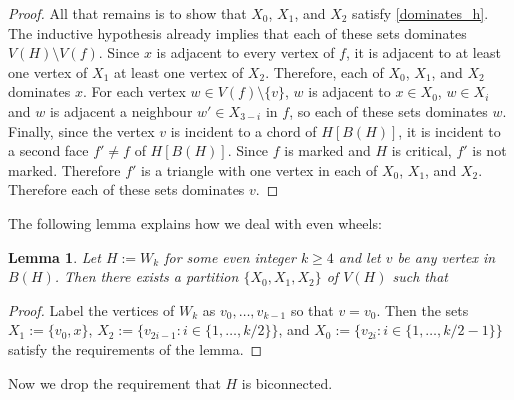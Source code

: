 \documentclass[12pt]{article}
\newtheorem{lem}{Lemma}
\theoremstyle{definition}
\newcommand{\pat}[1]{[\textcolor{red}{PM: #1}]}
\begin{document}
\begin{proof}
  All that remains is to show that $X_0$, $X_1$, and $X_2$ satisfy \cref{dominates_h}.  The inductive hypothesis already implies that each of these sets dominates $V(H)\setminus V(f)$.  Since $x$ is adjacent to every vertex of $f$, it is adjacent to at least one vertex of $X_1$ at least one vertex of $X_2$.  Therefore, each of $X_0$, $X_1$, and $X_2$ dominates $x$.  For each vertex $w\in V(f)\setminus\{v\}$, $w$ is adjacent to $x\in X_0$, $w\in X_{i}$ and $w$ is adjacent a neighbour $w'\in X_{3-i}$ in $f$, so each of these sets dominates $w$.  Finally, since the vertex $v$ is incident to a chord of $H[B(H)]$, it is incident to a second face $f'\neq f$ of $H[B(H)]$.  Since $f$ is marked and $H$ is critical, $f'$ is not marked.  Therefore $f'$ is a triangle with one vertex in each of $X_0$, $X_1$, and $X_2$. Therefore each of these sets dominates $v$.
\end{proof}

The following lemma explains how we deal with even wheels:

\begin{lem}\label{wheelie}
  Let $H:=W_k$ for some even integer $k\ge 4$ and let $v$ be any vertex in $B(H)$.  Then there exists a partition $\{X_0,X_1,X_2\}$ of $V(H)$ such that
\end{lem}

\begin{proof}
  Label the vertices of $W_k$ as $v_0,\ldots,v_{k-1}$ so that $v=v_0$.  Then the sets $X_1:=\{v_0, x\}$, $X_2:=\{v_{2i-1}:i\in\{1,\ldots,k/2\}\}$, and $X_0:=\{v_{2i}:i\in\{1,\ldots, k/2-1\}\}$ satisfy the requirements of the lemma.
\end{proof}


Now we drop the requirement that $H$ is biconnected.
\end{document}
